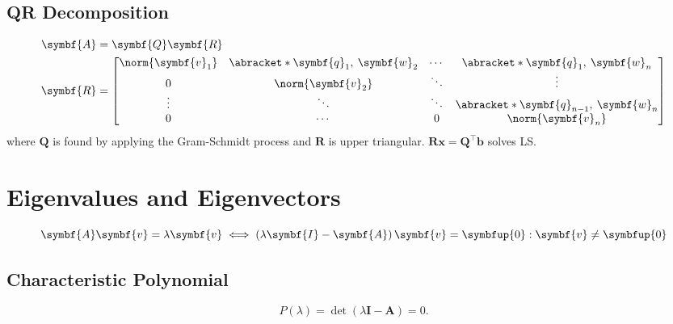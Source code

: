 \documentclass{article}
\begin{document}
\begin{multicols*}{3}
    \subsection{QR Decomposition}
    \begin{align*}
        \symbf{A} & = \symbf{Q} \symbf{R}                                                                                                                                                                  \\
        \symbf{R} & =
                      \begin{bmatrix}
                          \norm{\symbf{v}_1} & \abracket*{\symbf{q}_1,\: \symbf{w}_2} & \cdots & \abracket*{\symbf{q}_1,\: \symbf{w}_n}       \\
                          0                  & \norm{\symbf{v}_2}                     & \ddots & \vdots                                       \\
                          \vdots             & \ddots                                 & \ddots & \abracket*{\symbf{q}_{n - 1},\: \symbf{w}_n} \\
                          0                  & \cdots                                 & 0      & \norm{\symbf{v}_n}
                      \end{bmatrix}
    \end{align*}
    where \(\symbf{Q}\) is found by applying the Gram-Schmidt process and \(\symbf{R}\) is upper triangular. \(\symbf{R} \symbf{x} = \symbf{Q}^\top \symbf{b}\) solves LS\@.

    \section{Eigenvalues and Eigenvectors}
    \begin{equation*}
        \symbf{A} \symbf{v} = \lambda \symbf{v} \iff \left( \lambda \symbf{I} - \symbf{A} \right) \symbf{v} = \symbfup{0} : \symbf{v} \neq \symbfup{0}
    \end{equation*}
    \subsection{Characteristic Polynomial}
    \begin{equation*}
        P\left( \lambda \right) = \det{\left( \lambda \symbf{I} - \symbf{A} \right)} = 0.
    \end{equation*}

\end{multicols*}
\end{document}
